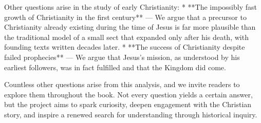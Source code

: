 Other questions arise in the study of early Christianity:
* **The impossibly fast growth of Christianity in the first century** — We argue that a precursor to Christianity already existing during the time of Jesus is far more plausible than the traditional model of a small sect that expanded only after his death, with founding texts written decades later.
* **The success of Christianity despite failed prophecies** — We argue that Jesus’s mission, as understood by his earliest followers, was in fact fulfilled and that the Kingdom did come.

Countless other questions arise from this analysis, and we invite readers to explore them throughout the book.
Not every question yields a certain answer, but the project aims to spark curiosity, deepen engagement with the Christian story, and inspire a renewed search for understanding through historical inquiry.
